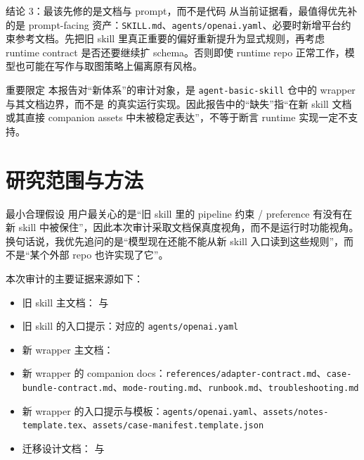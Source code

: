 \documentclass[a4paper]{article}
\begin{document}
\begin{findingbox}{结论 3：最该先修的是文档与 prompt，而不是代码}
从当前证据看，最值得优先补的是 prompt-facing 资产：\texttt{SKILL.md}、\texttt{agents/openai.yaml}、必要时新增平台约束参考文档。先把旧 skill 里真正重要的偏好重新提升为显式规则，再考虑 runtime contract 是否还要继续扩 schema。否则即使 runtime repo 正常工作，模型也可能在写作与取图策略上偏离原有风格。
\end{findingbox}

\begin{riskbox}{重要限定}
本报告对“新体系”的审计对象，是 \texttt{agent-basic-skill} 仓中的 wrapper 与其文档边界，而不是  的真实运行实现。因此报告中的“缺失”指“在新 skill 文档或其直接 companion assets 中未被稳定表达”，不等于断言 runtime 实现一定不支持。
\end{riskbox}

\section{研究范围与方法}

\begin{methodbox}{最小合理假设}
用户最关心的是“旧 skill 里的 pipeline 约束 / preference 有没有在新 skill 中被保住”，因此本次审计采取文档保真度视角，而不是运行时功能视角。换句话说，我优先追问的是“模型现在还能不能从新 skill 入口读到这些规则”，而不是“某个外部 repo 也许实现了它”。
\end{methodbox}

本次审计的主要证据来源如下：

\begin{itemize}
\item 旧 skill 主文档： 与 
\item 旧 skill 的入口提示：对应的 \texttt{agents/openai.yaml}
\item 新 wrapper 主文档：
\item 新 wrapper 的 companion docs：\texttt{references/adapter-contract.md}、\texttt{case-bundle-contract.md}、\texttt{mode-routing.md}、\texttt{runbook.md}、\texttt{troubleshooting.md}
\item 新 wrapper 的入口提示与模板：\texttt{agents/openai.yaml}、\texttt{assets/notes-template.tex}、\texttt{assets/case-manifest.template.json}
\item 迁移设计文档： 与 
\end{itemize}
\end{document}
